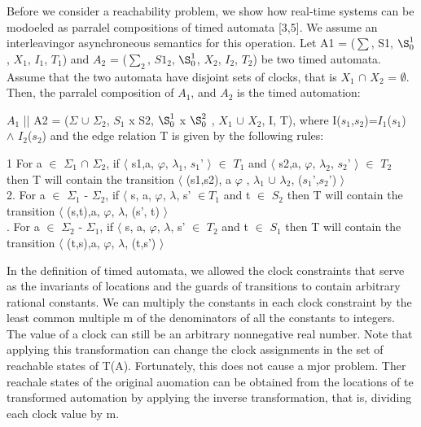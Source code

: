 \documentclass{article}
\begin{document}
	Before we consider a reachability problem, we show how real-time systems can be modoeled as parralel compositions of timed automata [3,5]. We assume an interleavingor asynchroneous semantics for this operation. Let A1 = ($\sum$, S1, $\S^{1}_0$, $X_1$, $I_1$, $T_1$) and $A_2$ = ($\sum_2$, $S1_2$, $\S^{1}_0$, $X_2$, $I_2$, $T_2$) be two timed automata. Assume that the two automata have disjoint sets of clocks, that is $X_1$ $\cap$ $X_2$ = $\emptyset$. Then, the parralel composition of $A_1$, and $A_2$ is the timed automation:
	
	$A_1$ || A2 = ($\Sigma$ $\cup$ $\Sigma_2$, $S_1$ x S2, $\S^{1}_0$ x  $\S^{2}_0$ , $X_1$ $\cup$ $X_2$, I, T),
	where I($s_1$,$s_2$)=$I_1$($s_1$) $\wedge$ $I_2$($s_2$) and the edge relation T is given by the following rules:\\ \newline
	
	1 For a $\in$ $\Sigma_1$ $\cap$ $\Sigma_2$, if $\langle$ s1,a, $\varphi$, $\lambda_1$, $s_1$' $\rangle$ $\in$ $T_1$ and $\langle$ s2,a, $\varphi$, $\lambda_2$, $s_2$' $\rangle$ $\in$ $T_2$ \\ then T will contain the transition $\langle$ (s1,s2), a $\varphi$ , $\lambda_1$ $\cup$ $\lambda_2$, ($s_1$',$s_2$') $\rangle$ \\ 
	2. For a $\in$ $\Sigma_1$ - $\Sigma_2$, if $\langle$ s, a, $\varphi$, $\lambda$, s' $\in T_1$ and t $\in$ $S_2$ then T will contain the transition $\langle$ (s,t),a, $\varphi$, $\lambda$, (s', t) $\rangle$ \\ . For a $\in$ $\Sigma_2$ - $\Sigma_1$, if $\langle$ s, a, $\varphi$, $\lambda$, s' $\in$ $T_2$ and t $\in$ $S_1$ then T will contain the transition $\langle$ (t,s),a, $\varphi$, $\lambda$, (t,s') $\rangle$
	
	
	
	In the definition	 of timed automata, we allowed the clock constraints that serve as the invariants of locations and the guards of transitions to contain arbitrary rational constants.
	We can multiply the constants in each clock constraint by the least common multiple m of the denominators of all the constants to integers. The value of a clock can still be an arbitrary nonnegative real number. Note that applying this transformation can change the clock assignments in the set of reachable states of T(A). Fortunately, this does not cause a mjor problem. Ther reachale states of the original auomation can be obtained from the locations of te transformed automation by applying the inverse transformation, that is, dividing each clock value by m.
	
\end{document}
